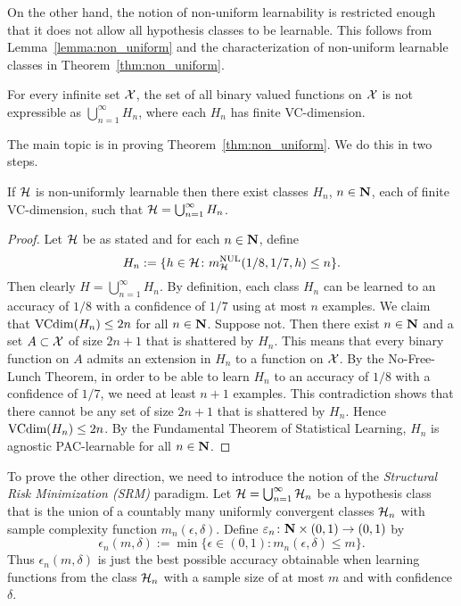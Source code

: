 On the other hand, the notion of non-uniform learnability is restricted enough
that it does not allow all hypothesis classes to be learnable. This follows
from Lemma~\ref{lemma:non_uniform} and the characterization of non-uniform
learnable classes in Theorem~\ref{thm:non_uniform}.

\begin{lemma}\label{lemma:non_uniform}
For every infinite set $\mathcal{X}$, the set of all binary valued functions on $\mathcal{X}$ is
not expressible as $\bigcup_{n = 1}^{\infty} H_n$, where each $H_n$ has finite VC-dimension.
\end{lemma}

The main topic is in proving Theorem~\ref{thm:non_uniform}. We do this in two steps.
\begin{lemma}\label{lemma:if_side}
If $\mathcal{H}$ is non-uniformly learnable then there exist classes $H_n$, $n \in \mathbf{N}$, each
of finite VC-dimension, such that $\mathcal{H} = \bigcup_{n = 1}^{\infty} H_n$.
\end{lemma}
\begin{proof}
Let $\mathcal{H}$ be as stated and for each $n \in \mathbf{N}$, define
\[
    H_n := \{h \in \mathcal{H} \colon m_{\mathcal{H}}^{\text{NUL}} (1/8, 1/7, h) \leq n\}.
\]
Then clearly $H = \bigcup_{n = 1}^{\infty} H_n$. By definition, each class $H_n$
can be learned to an accuracy of $1/8$ with a confidence of $1/7$ using at most $n$
examples. We claim that $\text{VCdim} (H_n) \leq 2n$ for all
$n \in \mathbf{N}$. Suppose not. Then there exist $n \in \mathbf{N}$ and a set $A \subset \mathcal{X}$ of size
$2n + 1$ that is shattered by $H_n$. This means that every binary function on $A$ admits
an extension in $H_n$ to a function on $\mathcal{X}$. By the No-Free-Lunch Theorem, in order
to be able to learn $H_n$ to an accuracy of $1/8$ with a confidence of $1/7$, we need
at least $n + 1$ examples. This contradiction shows that there cannot be any set
of size $2n + 1$ that is shattered by $H_n$. Hence $\text{VCdim} (H_n) \leq 2n$. By the
Fundamental Theorem of Statistical Learning, $H_n$ is agnostic PAC-learnable for all
$n \in \mathbf{N}$.
\qedhere
\end{proof}


To prove the other direction, we need to introduce the notion of the \emph{Structural
Risk Minimization (SRM)} paradigm. Let $\mathcal{H} = \bigcup_{n = 1}^{\infty} \mathcal{H}_n$
be a hypothesis class that is the union of a countably many uniformly convergent
classes $\mathcal{H}_n$ with sample complexity function
$m_n (\epsilon, \delta)$. Define $\varepsilon_n \colon \mathbf{N} \times (0, 1) \rightarrow (0, 1)$
by
\[
    \epsilon_n (m, \delta) :=
        \min \{\epsilon \in (0, 1) \colon m_n (\epsilon, \delta) \leq m\}.
\]
Thus $\epsilon_n (m, \delta)$ is just the best possible accuracy obtainable
when learning functions from the class $\mathcal{H}_n$ with a sample size of
at most $m$ and with confidence $\delta$.

